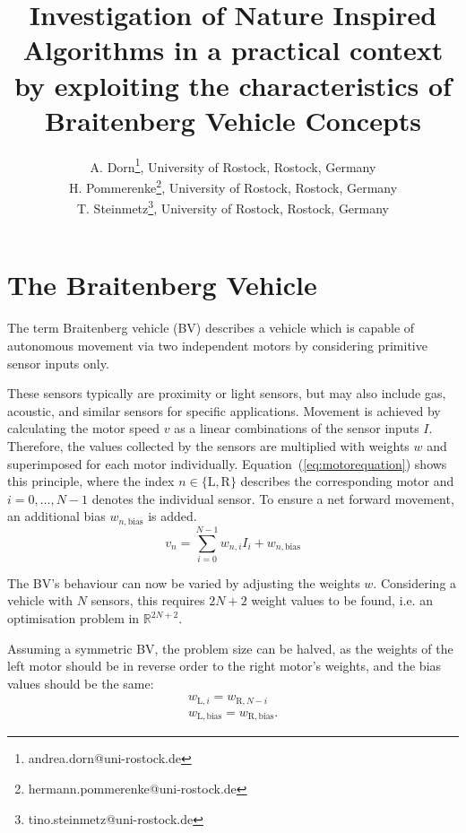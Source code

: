 \documentclass[a4paper]{jacow}
\begin{document}
\title{Investigation of Nature Inspired Algorithms in a practical context by exploiting the characteristics of Braitenberg Vehicle Concepts}

\author{A. Dorn\thanks{andrea.dorn@uni-rostock.de}, University of Rostock, Rostock, Germany \\
		H. Pommerenke\thanks{hermann.pommerenke@uni-rostock.de}, University of Rostock, Rostock, Germany \\
		T. Steinmetz\thanks{tino.steinmetz@uni-rostock.de}, University of Rostock, Rostock, Germany}
	
\maketitle


\section{The Braitenberg Vehicle}

The term Braitenberg vehicle (BV) describes a vehicle which is capable of autonomous movement via two independent motors by considering primitive sensor inputs only.

These sensors typically are proximity or light sensors, but may also include gas, acoustic, and similar sensors for specific applications. Movement is achieved by calculating the motor speed $v$ as a linear combinations of the sensor inputs $I$. Therefore, the values collected by the sensors are multiplied with weights $w$ and superimposed for each motor individually. Equation~(\ref{eq:motorequation}) shows this principle, where the index $n\in\{\mathrm{L},\mathrm{R}\}$ describes the corresponding motor and $i=0,\ldots,N-1$ denotes the individual sensor. To ensure a net forward movement, an additional bias $w_{n,\text{bias}}$ is added.
\begin{equation}
	v_{n} = \sum\limits_{i=0}^{N-1} w_{n,i} I_{i} + w_{n,\text{bias}}
	\label{eq:motorequation}
\end{equation}

The BV's behaviour can now be varied by adjusting the weights $w$. Considering a vehicle with $N$ sensors, this requires $2N+2$ weight values to be found, i.e. an optimisation problem in $\mathbb{R}^{2N+2}$.

Assuming a symmetric BV, the problem size can be halved, as the weights of the left motor should be in reverse order to the right motor's weights, and the bias values should be the same:
\begin{align}
	w_{\mathrm{L}, i} = w_{\mathrm{R}, N-i} \nonumber \\
	w_{\mathrm{L},\text{bias}} = w_{\mathrm{R},\text{bias}}.\label{eq:symmetry}
\end{align}
\end{document}
